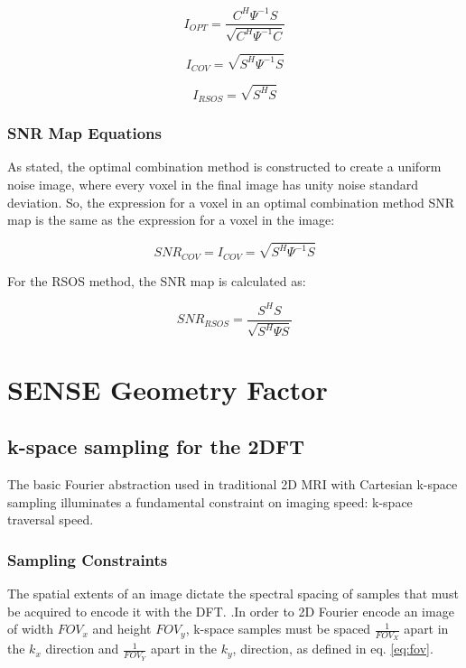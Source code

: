 \begin{equation} \label{eq:I_OPT}
I_{OPT}=\frac{C^H\Psi^{-1}S}{\sqrt{C^H\Psi^{-1}C}}
\end{equation}

\begin{equation} \label{eq:I_COV}
I_{COV}=\sqrt{S^H\Psi^{-1}S}
\end{equation}

\begin{equation} \label{eq:I_RSOS}
I_{RSOS}=\sqrt{S^{H} S}
\end{equation}

\subsubsection{SNR Map Equations}

As stated, the optimal combination method is constructed to create a uniform noise image, where every voxel in the final
image has unity noise standard deviation. So, the expression for a voxel in an optimal combination method SNR map is the
same as the expression for a voxel in the image:

\begin{equation} \label{eq:SNR_COV}
    SNR_{COV}= I_{COV} = \sqrt{S^H\Psi^{-1}S}
\end{equation}

For the RSOS method, the SNR map is calculated as:

\begin{equation} \label{eq:SNR_RSOS}
    SNR_{RSOS}= \frac{S^HS}{\sqrt{S^H \Psi S}}
\end{equation}

\section{SENSE Geometry Factor}

\subsection{k-space sampling for the 2DFT}
The basic Fourier abstraction used in traditional 2D MRI with Cartesian k-space sampling illuminates a fundamental
constraint on imaging speed: k-space traversal speed.

\subsubsection{Sampling Constraints}
The spatial extents of an image dictate the spectral spacing of samples that must be acquired to encode it with the DFT.
\cite{nishimura} .In order to 2D Fourier encode an image of width $FOV_x$ and height $FOV_y$, k-space samples must be
spaced $\frac{1}{FOV_X}$ apart in the $k_x$ direction and $\frac{1}{FOV_Y}$ apart in the $k_y$, direction, as defined in
eq. \ref{eq:fov}.

